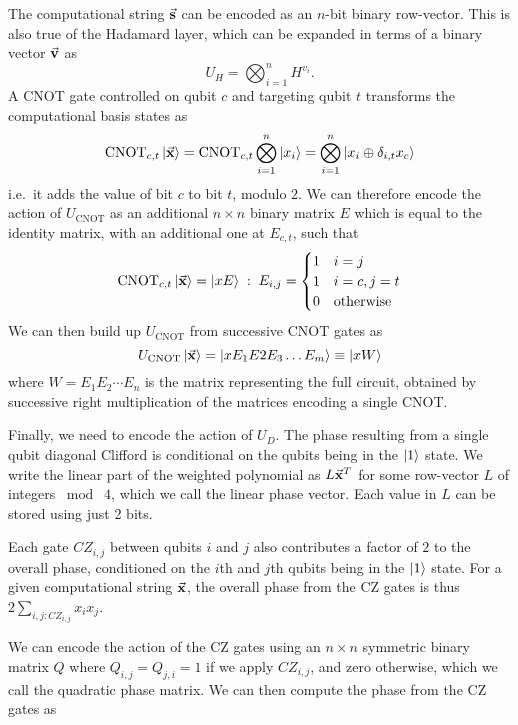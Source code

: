 The computational string $\va{s}$ can be encoded as an $n$-bit binary row-vector. This is also true of the Hadamard layer, which can be expanded in terms of a binary vector $\va{v}$ as
\begin{equation}
U_{H} = \bigotimes_{i=1}^{n} H^{v_{i}}.
\label{eq:binaryhad}
\end{equation}
A CNOT gate controlled on qubit $c$ and targeting qubit $t$ transforms the computational basis states as
\[
\text{CNOT}_{c,t}\ket{\va{x}} = \text{CNOT}_{c,t}\bigotimes_{i=1}^{n}\ket{x_{i}} = \bigotimes_{i=1}^{n}\ket{x_{i}\oplus\delta_{i,t}x_{c}}
\]
i.e.~it adds the value of bit $c$ to bit $t$, modulo $2$. We can therefore encode the action of $U_{\text{CNOT}}$ as an additional $n\times n$ binary matrix $E$ which is equal to the identity matrix, with an additional one at $E_{c,t}$, such that
\begin{equation}
\text{CNOT}_{c,t}\ket{\va{x}} = \ket{xE}\;:\; E_{i,j}=\begin{cases} 1 & i=j\\ 1 & i=c, j=t \\ 0 & \text{otherwise} \end{cases}
\label{eq:cnot_matrix}
\end{equation}
We can then build up $U_{\text{CNOT}}$ from successive CNOT gates as
\begin{equation}
U_{\text{CNOT}}\ket{\va{x}} = \ket{x E_{1}E{2}E_{3}\dots E_{m}} \equiv \ket{xW} \label{eq:cnot_matrices}
\end{equation}
where $W=E_{1}E_{2}\cdots E_{n}$ is the matrix representing the full circuit, obtained by successive right multiplication of the matrices encoding a single CNOT.\par
Finally, we need to encode the action of $U_{D}$. The phase resulting from a single qubit diagonal Clifford is conditional on the qubits being in the $\ket{1}$ state. We write the linear part of the weighted polynomial as $L\va{x}^{T}$ for some row-vector $L$ of integers $\bmod\;4$, which we call the linear phase vector. Each value in $L$ can be stored using just 2 bits.\par 
Each gate $CZ_{i,j}$ between qubits $i$ and $j$ also contributes a factor of $2$ to the overall phase, conditioned on the $i$th and $j$th qubits being in the $\ket{1}$ state. For a given computational string $\va{x}$, the overall phase from the CZ gates is thus $2\sum_{i,j : CZ_{i,j}} x_{i}x_{j}$.\par
We can encode the action of the CZ gates using an $n\times n$ symmetric binary matrix $Q$ where $Q_{i,j}=Q_{j,i}=1$ if we apply $CZ_{i,j}$, and zero otherwise, which we call the quadratic phase matrix. We can then compute the phase from the CZ gates as

